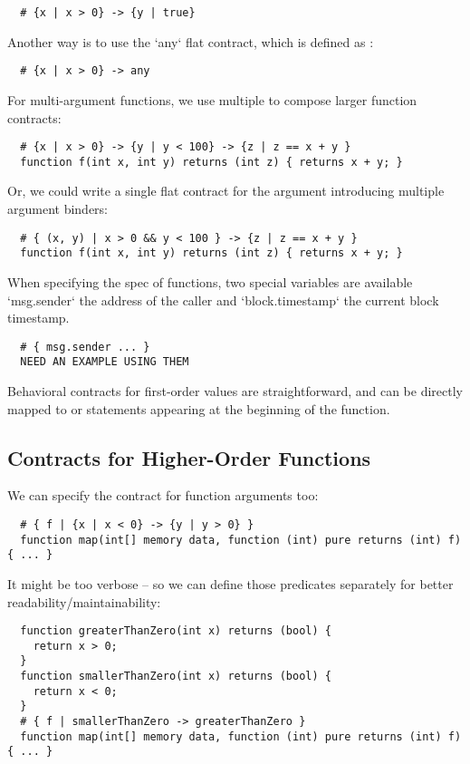 \documentclass[acmsmall,review,anonymous]{acmart}\settopmatter{printfolios=true,printccs=false,printacmref=false}
\begin{document}
\begin{lstlisting}
  # {x | x > 0} -> {y | true}
\end{lstlisting}
Another way is to use the `any` flat contract, which is defined as
:
\begin{lstlisting}
  # {x | x > 0} -> any
\end{lstlisting}

For multi-argument functions, we use multiple \code{->} to compose larger function
contracts:
\begin{lstlisting}
  # {x | x > 0} -> {y | y < 100} -> {z | z == x + y }
  function f(int x, int y) returns (int z) { returns x + y; }
\end{lstlisting}
Or, we could write a single flat contract for the argument introducing
multiple argument binders:
\begin{lstlisting}
  # { (x, y) | x > 0 && y < 100 } -> {z | z == x + y }
  function f(int x, int y) returns (int z) { returns x + y; }
\end{lstlisting}

When specifying the spec of functions, two special variables are available
`msg.sender` the address of the caller and `block.timestamp` the current
block timestamp.

\begin{lstlisting}
  # { msg.sender ... }
  NEED AN EXAMPLE USING THEM
\end{lstlisting}

Behavioral contracts for first-order values are straightforward,
and can be directly mapped to  or  statements
appearing at the beginning of the function.

\subsection{Contracts for Higher-Order Functions}

\iffalse
	\begin{lstlisting}
function map(uint[] memory data, function (uint) pure returns (uint) f)
  internal pure returns (uint[] memory r)
{
  r = new uint[](data.length);
  for (uint i = 0; i < data.length; i++) {
    r[i] = f(data[i]);
  }
}
\end{lstlisting}
\fi

We can specify the contract for function arguments too:
\begin{lstlisting}
  # { f | {x | x < 0} -> {y | y > 0} }
  function map(int[] memory data, function (int) pure returns (int) f) { ... }
\end{lstlisting}
It might be too verbose -- so we can define those predicates separately for better readability/maintainability:
\begin{lstlisting}
  function greaterThanZero(int x) returns (bool) {
    return x > 0;
  }
  function smallerThanZero(int x) returns (bool) {
    return x < 0;
  }
  # { f | smallerThanZero -> greaterThanZero }
  function map(int[] memory data, function (int) pure returns (int) f) { ... }
\end{lstlisting}
\end{document}
